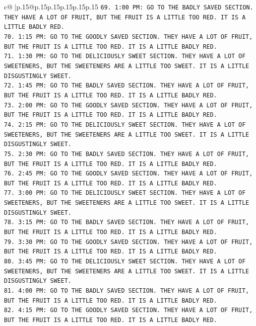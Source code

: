 \documentclass{article}
\begin{document}
{\begin{supertabular}{c@{$\;$}|p{.15\linewidth}@{}p{.15\linewidth}p{.15\linewidth}p{.15\linewidth}p{.15\linewidth}p{.15\linewidth}}
{{{\texttt{69. 1:00 PM: GO TO THE BADLY SAVED SECTION. THEY HAVE A LOT OF FRUIT, BUT THE FRUIT IS A LITTLE TOO RED. IT IS A LITTLE BADLY RED.} \\
\texttt{70. 1:15 PM: GO TO THE GOODLY SAVED SECTION. THEY HAVE A LOT OF FRUIT, BUT THE FRUIT IS A LITTLE TOO RED. IT IS A LITTLE BADLY RED.} \\
\texttt{71. 1:30 PM: GO TO THE DELICIOUSLY SWEET SECTION. THEY HAVE A LOT OF SWEETENERS, BUT THE SWEETENERS ARE A LITTLE TOO SWEET. IT IS A LITTLE DISGUSTINGLY SWEET.} \\
\texttt{72. 1:45 PM: GO TO THE BADLY SAVED SECTION. THEY HAVE A LOT OF FRUIT, BUT THE FRUIT IS A LITTLE TOO RED. IT IS A LITTLE BADLY RED.} \\
\texttt{73. 2:00 PM: GO TO THE GOODLY SAVED SECTION. THEY HAVE A LOT OF FRUIT, BUT THE FRUIT IS A LITTLE TOO RED. IT IS A LITTLE BADLY RED.} \\
\texttt{74. 2:15 PM: GO TO THE DELICIOUSLY SWEET SECTION. THEY HAVE A LOT OF SWEETENERS, BUT THE SWEETENERS ARE A LITTLE TOO SWEET. IT IS A LITTLE DISGUSTINGLY SWEET.} \\
\texttt{75. 2:30 PM: GO TO THE BADLY SAVED SECTION. THEY HAVE A LOT OF FRUIT, BUT THE FRUIT IS A LITTLE TOO RED. IT IS A LITTLE BADLY RED.} \\
\texttt{76. 2:45 PM: GO TO THE GOODLY SAVED SECTION. THEY HAVE A LOT OF FRUIT, BUT THE FRUIT IS A LITTLE TOO RED. IT IS A LITTLE BADLY RED.} \\
\texttt{77. 3:00 PM: GO TO THE DELICIOUSLY SWEET SECTION. THEY HAVE A LOT OF SWEETENERS, BUT THE SWEETENERS ARE A LITTLE TOO SWEET. IT IS A LITTLE DISGUSTINGLY SWEET.} \\
\texttt{78. 3:15 PM: GO TO THE BADLY SAVED SECTION. THEY HAVE A LOT OF FRUIT, BUT THE FRUIT IS A LITTLE TOO RED. IT IS A LITTLE BADLY RED.} \\
\texttt{79. 3:30 PM: GO TO THE GOODLY SAVED SECTION. THEY HAVE A LOT OF FRUIT, BUT THE FRUIT IS A LITTLE TOO RED. IT IS A LITTLE BADLY RED.} \\
\texttt{80. 3:45 PM: GO TO THE DELICIOUSLY SWEET SECTION. THEY HAVE A LOT OF SWEETENERS, BUT THE SWEETENERS ARE A LITTLE TOO SWEET. IT IS A LITTLE DISGUSTINGLY SWEET.} \\
\texttt{81. 4:00 PM: GO TO THE BADLY SAVED SECTION. THEY HAVE A LOT OF FRUIT, BUT THE FRUIT IS A LITTLE TOO RED. IT IS A LITTLE BADLY RED.} \\
\texttt{82. 4:15 PM: GO TO THE GOODLY SAVED SECTION. THEY HAVE A LOT OF FRUIT, BUT THE FRUIT IS A LITTLE TOO RED. IT IS A LITTLE BADLY RED.} \\
}}}
\end{supertabular}}
\end{document}
